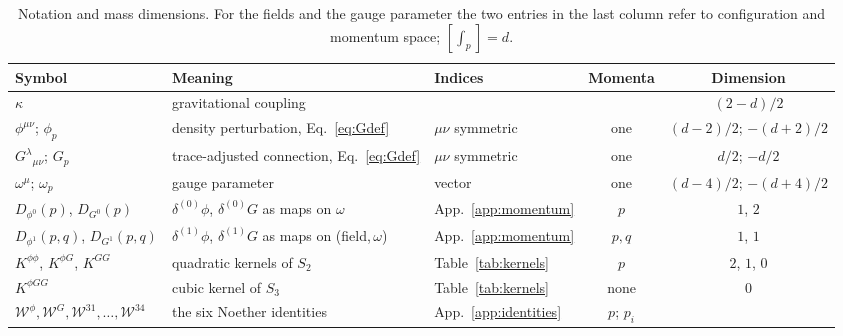 \documentclass[prd,aps,preprint,superscriptaddress,nofootinbib,amsmath,amssymb,eqsecnum]{revtex4-2}
\newcommand{\W}{\mathcal{W}}
\newcommand{\ip}[1]{\int_{#1}}
\begin{document}
\begin{table}[htb]
\centering\scriptsize
\begin{tabular}{@{}lllcc@{}}
\toprule
Symbol & Meaning & Indices & Momenta & Dimension \\
\midrule
$\kappa$ & gravitational coupling & & & $(2-d)/2$ \\
$\phi^{\mu\nu}$; $\phi_p$ & density perturbation, Eq.~\eqref{eq:Gdef} & $\mu\nu$ symmetric & one & $(d-2)/2$; $-(d+2)/2$ \\
$G^{\lambda}{}_{\mu\nu}$; $G_p$ & trace-adjusted connection, Eq.~\eqref{eq:Gdef} & $\mu\nu$ symmetric & one & $d/2$; $-d/2$ \\
$\omega^{\mu}$; $\omega_p$ & gauge parameter & vector & one & $(d-4)/2$; $-(d+4)/2$ \\
$D_{\phi^0}(p)$, $D_{G^0}(p)$ & $\delta^{(0)}\phi$, $\delta^{(0)}G$ as maps on $\omega$ & App.~\ref{app:momentum} & $p$ & $1$, $2$ \\
$D_{\phi^1}(p,q)$, $D_{G^1}(p,q)$ & $\delta^{(1)}\phi$, $\delta^{(1)}G$ as maps on (field,\,$\omega$) & App.~\ref{app:momentum} & $p,q$ & $1$, $1$ \\
$K^{\phi\phi}$, $K^{\phi G}$, $K^{GG}$ & quadratic kernels of $S_2$ & Table~\ref{tab:kernels} & $p$ & $2$, $1$, $0$ \\
$K^{\phi GG}$ & cubic kernel of $S_3$ & Table~\ref{tab:kernels} & none & $0$ \\
$\W^{\phi},\W^{G},\W^{31},\dots,\W^{34}$ & the six Noether identities & App.~\ref{app:identities} & $p$; $p_i$ & \\
\bottomrule
\end{tabular}
\caption{Notation and mass dimensions. For the fields and the gauge parameter the two entries
in the last column refer to configuration and momentum space; $[\ip{p}]=d$.}
\label{tab:notation}
\end{table}
\end{document}
